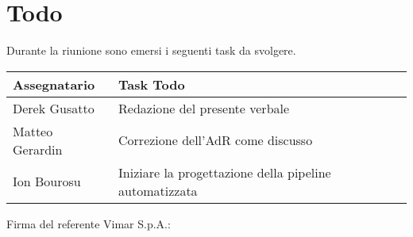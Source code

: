 \section{Todo}
Durante la riunione sono emersi i seguenti task da svolgere.

\begin{center}
  \begin{tabular}{|L{5cm}|L{8cm}|}
    \hline
    \textbf{Assegnatario} & \textbf{Task Todo} \\ \hline
     Derek Gusatto &  Redazione del presente verbale \\ \hline
     Matteo Gerardin & Correzione dell'AdR come discusso \\ \hline
     Ion Bourosu & Iniziare la progettazione della pipeline automatizzata \\ \hline

  \end{tabular}
\end{center}

\vfill
\noindent Firma del referente Vimar S.p.A.: \hfill \underline{\hspace{5cm}}